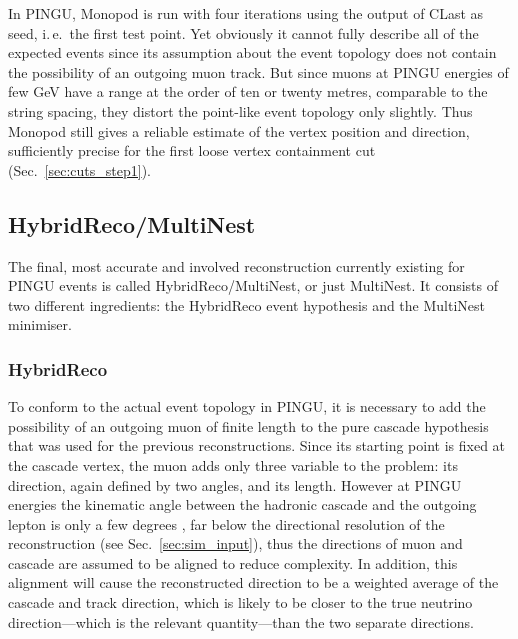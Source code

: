 In PINGU, Monopod is run with four iterations using the output of CLast as
seed, i.\,e.\ the first test point. Yet obviously it cannot fully describe
all of the expected events since its assumption about the event topology does
not contain the possibility of an outgoing muon track. But since muons at PINGU
energies of few GeV have a range at the order of ten or twenty metres,
comparable to the string spacing, they distort the point-like event topology
only slightly. Thus Monopod still gives a reliable estimate of the vertex
position and direction, sufficiently precise for the first loose vertex
containment cut (Sec.~\ref{sec:cuts_step1}).

\subsection{HybridReco/MultiNest}
\label{sec:reco_multinest}

The final, most accurate and involved reconstruction currently existing for 
PINGU events is called
HybridReco/MultiNest, or just MultiNest. It consists of two different
ingredients: the HybridReco event hypothesis and the MultiNest minimiser.

\subsubsection{HybridReco}

To conform to the actual event topology in PINGU, it is necessary to add the
possibility of an outgoing muon of finite length to the pure cascade hypothesis
that was used for the previous reconstructions. Since its starting point is
fixed at the cascade vertex, the muon adds only three variable to the problem:
its direction, again defined by two angles, and its length. However at PINGU
energies the kinematic angle between the hadronic cascade and the outgoing
lepton is only a few degrees \cite{NuScattAng}, far below the directional
resolution of the reconstruction (see Sec.~\ref{sec:sim_input}), thus the
directions
of muon and cascade are assumed to be aligned to reduce complexity. In addition,
this alignment will cause the reconstructed direction to be a weighted average
of the cascade and track direction, which is likely to be closer to the true
neutrino direction---which is the relevant quantity---than the two separate
directions.

